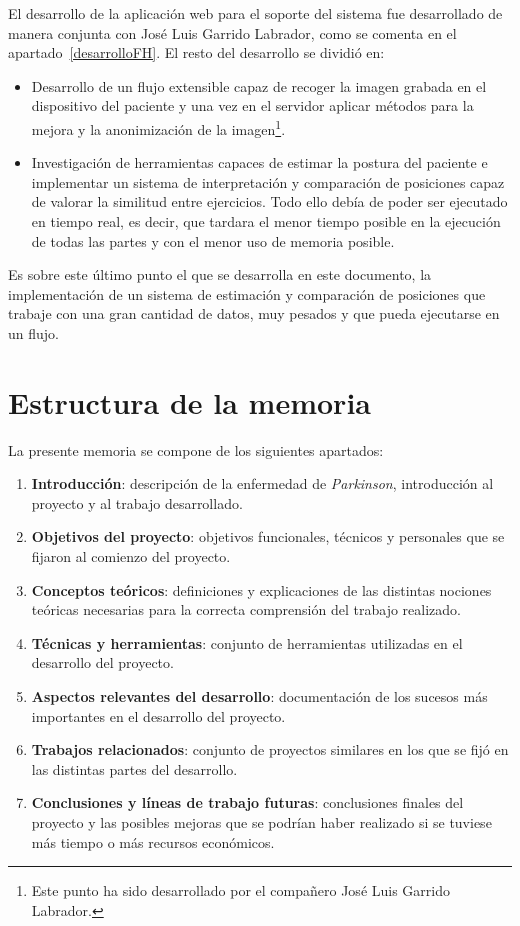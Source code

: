 El desarrollo de la aplicación web para el soporte del sistema fue desarrollado de manera conjunta con José Luis Garrido Labrador, como se comenta en el apartado~\ref{desarrolloFH}. El resto del desarrollo se dividió en:
\begin{itemize}
	\item Desarrollo de un flujo extensible capaz de recoger la imagen grabada en el dispositivo del paciente y una vez en el servidor aplicar métodos para la mejora y la anonimización de la imagen\footnote{Este punto ha sido desarrollado por el compañero José Luis Garrido Labrador.}.
	\item Investigación de herramientas capaces de estimar la postura del paciente e implementar un sistema de interpretación y comparación de posiciones capaz de valorar la similitud entre ejercicios. Todo ello debía de poder ser ejecutado en tiempo real, es decir, que tardara el menor tiempo posible en la ejecución de todas las partes y con el menor uso de memoria posible.
\end{itemize}

Es sobre este último punto el que se desarrolla en este documento, la implementación de un sistema de estimación y comparación de posiciones que trabaje con una gran cantidad de datos, muy pesados y que pueda ejecutarse en un flujo.

\section{Estructura de la memoria}
La presente memoria se compone de los siguientes apartados:
\begin{enumerate}
	\item \textbf{Introducción}: descripción de la enfermedad de \textit{Parkinson}, introducción al proyecto y al trabajo desarrollado.
	\item \textbf{Objetivos del proyecto}: objetivos funcionales, técnicos y personales que se fijaron al comienzo del proyecto.
	\item \textbf{Conceptos teóricos}: definiciones y explicaciones de las distintas nociones teóricas necesarias para la correcta comprensión del trabajo realizado.
	\item \textbf{Técnicas y herramientas}: conjunto de herramientas utilizadas en el desarrollo del proyecto.
	\item \textbf{Aspectos relevantes del desarrollo}: documentación de los sucesos más importantes en el desarrollo del proyecto.
	\item \textbf{Trabajos relacionados}: conjunto de proyectos similares en los que se fijó en las distintas partes del desarrollo.
	\item \textbf{Conclusiones y líneas de trabajo futuras}: conclusiones finales del proyecto y las posibles mejoras que se podrían haber realizado si se tuviese más tiempo o más recursos económicos.
\end{enumerate}

